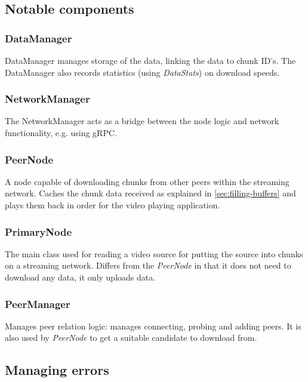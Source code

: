 \documentclass[10pt, a4paper]{article}
\begin{document}
\subsection{Notable components}

\subsubsection*{DataManager}
DataManager manages storage of the data, linking the data to chunk ID's. The
DataManager also records statistics (using \emph{DataStats}) on download speeds.

\subsubsection*{NetworkManager}

The NetworkManager acts as a bridge between the node logic and network
functionality, e.g. using gRPC.

\subsubsection*{PeerNode}

A node capable of downloading chunks from other peers within the streaming
network. Caches the chunk data received as explained in
\autoref{sec:filling-buffers} and plays them back in order for the video playing
application.

\subsubsection*{PrimaryNode}

The main class used for reading a video source for putting the source into
chunks on a streaming network. Differs from the \emph{PeerNode} in that it does
not need to download any data, it only uploads data.

\subsubsection*{PeerManager}

Manages peer relation logic: manages connecting, probing and adding peers. It is
also used by \emph{PeerNode} to get a suitable candidate to download from.

\subsection{Managing errors}
\end{document}
